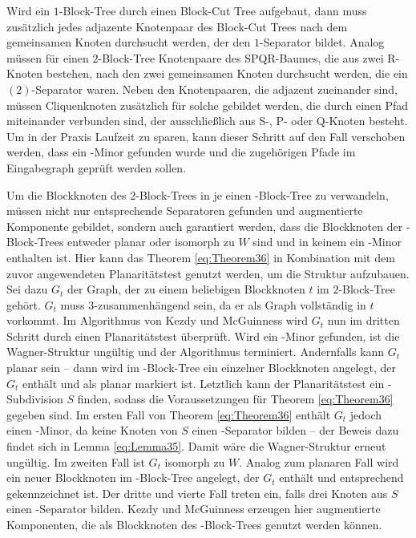 Wird ein $1$-Block-Tree durch einen Block-Cut Tree aufgebaut, dann muss zusätzlich jedes adjazente Knotenpaar des Block-Cut Trees nach dem gemeinsamen Knoten durchsucht werden, der den $1$-Separator bildet.
Analog müssen für einen $2$-Block-Tree Knotenpaare des SPQR-Baumes, die aus zwei R-Knoten bestehen, nach den zwei gemeinsamen Knoten durchsucht werden, die ein $(2)$-Separator waren.
Neben den Knotenpaaren, die adjazent zueinander sind, müssen Cliquenknoten zusätzlich für solche gebildet werden, die durch einen Pfad miteinander verbunden sind, der ausschließlich aus S-, P- oder Q-Knoten besteht.
Um in der Praxis Laufzeit zu sparen, kann dieser Schritt auf den Fall verschoben werden, dass ein \kf-Minor gefunden wurde und die zugehörigen Pfade im Eingabegraph geprüft werden sollen.

Um die Blockknoten des $2$-Block-Trees in je einen \dd-Block-Tree zu verwandeln, müssen nicht nur entsprechende Separatoren gefunden und augmentierte Komponente gebildet, sondern auch garantiert werden, dass die Blockknoten der \dd-Block-Trees entweder planar oder isomorph zu $W$ sind und in keinem ein \kf-Minor enthalten ist.
Hier kann das Theorem \ref{eq:Theorem36} in Kombination mit dem zuvor angewendeten Planaritätstest genutzt werden, um die Struktur aufzubauen.
Sei dazu $G_t$ der Graph, der zu einem beliebigen Blockknoten $t$ im $2$-Block-Tree gehört.
$G_t$ muss $3$-zusammenhängend sein, da er als Graph vollständig in $t$ vorkommt.
Im Algorithmus von Kezdy und McGuinness wird $G_t$ nun im dritten Schritt durch einen Planaritätstest überprüft.
Wird ein \kf-Minor gefunden, ist die Wagner-Struktur ungültig und der Algorithmus terminiert.
Andernfalls kann $G_t$ planar sein -- dann wird im \dd-Block-Tree ein einzelner Blockknoten angelegt, der $G_t$ enthält und als planar markiert ist.
Letztlich kann der Planaritätstest ein \kdd-Subdivision $S$ finden, sodass die Voraussetzungen für Theorem \ref{eq:Theorem36} gegeben sind.
Im ersten Fall von Theorem \ref{eq:Theorem36} enthält $G_t$ jedoch einen \kf-Minor, da keine Knoten von $S$ einen \dd-Separator bilden -- der Beweis dazu findet sich in Lemma \ref{eq:Lemma35}.
Damit wäre die Wagner-Struktur erneut ungültig.
Im zweiten Fall ist $G_t$ isomorph zu $W$.
Analog zum planaren Fall wird ein neuer Blockknoten im \dd-Block-Tree angelegt, der $G_t$ enthält und entsprechend gekennzeichnet ist.
Der dritte und vierte Fall treten ein, falls drei Knoten aus $S$ einen \dd-Separator bilden.
Kezdy und McGuinness erzeugen hier augmentierte Komponenten, die als Blockknoten des \dd-Block-Trees genutzt werden können.
